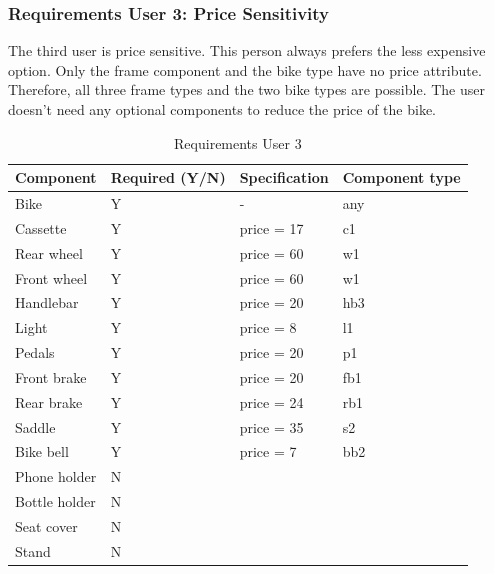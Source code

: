 \subsubsection{Requirements User 3: Price Sensitivity}
The third user is price sensitive. This person always prefers the less expensive option. Only the frame component and the bike type have no price attribute. Therefore, all three frame types and the two bike types are possible. The user doesn't need any optional components to reduce the price of the bike. 

\begin{table}[H]
\centering
\begin{tabular}{llll}
\hline
Component       & Required   (Y/N) & Specification          & Component type \\ \hline
Bike            & Y                & -                      & any  \\
Cassette        & Y                & price = 17             & c1            \\
Rear wheel      & Y                & price = 60             & w1            \\
Front wheel     & Y                & price = 60             & w1            \\
Handlebar       & Y                & price = 20             & hb3           \\
Light           & Y                & price = 8              & l1            \\
Pedals          & Y                & price = 20             & p1            \\
Front brake     & Y                & price = 20             & fb1           \\
Rear brake      & Y                & price = 24             & rb1           \\
Saddle          & Y                & price = 35             & s2            \\
Bike bell       & Y                & price = 7              & bb2           \\
Phone holder    & N                &                        &               \\
Bottle   holder & N                &                        &               \\
Seat cover      & N                &                        &               \\
Stand           & N                &                        &               \\ \hline
\end{tabular}
\caption{Requirements User 3}
\label{tab:userreq3}
\end{table}